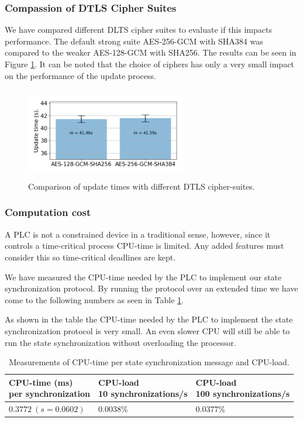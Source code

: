 \subsubsection{Compassion of DTLS Cipher Suites}
We have compared different DLTS cipher suites to evaluate if this impacts performance. The default strong suite AES-256-GCM with SHA384 was compared to the weaker AES-128-GCM with SHA256. The results can be seen in Figure \ref{figure:ciphers}. It can be noted that the choice of ciphers has only a very small impact on the performance of the update process.

\begin{figure}[ht]
\vspace*{-0.2in}
   \centering
    \includegraphics[height=4cm, width=7cm]{papers/digital-twin/images/FIG9_TII-19-1326}
    \vspace*{-0.15in}
    \caption{Comparison of update times with different DTLS cipher-suites.}
    \label{figure:ciphers}
\end{figure}

\subsubsection{Computation cost}
A PLC is not a constrained device in a traditional sense, however, since it controls a time-critical process CPU-time is limited. Any added features must consider this so time-critical deadlines are kept.

We have measured the CPU-time needed by the PLC to implement our state synchronization protocol. By running the protocol over an extended time we have come to the following numbers as seen in Table \ref{table:cpu-time}. 

As shown in the table the CPU-time needed by the PLC to implement the state synchronization protocol is very small. An even slower CPU will still be able to run the state synchronization without overloading the processor.

\begin{table}[]
\begin{tabular}{lll}

 \thead{CPU-time (ms)\\per synchronization} & \thead{ CPU-load  \\ 10 synchronizations/s} & \thead{CPU-load \\ 100 synchronizations/s} \\ \hline
           $0.3772 \: (s = 0.0602)$   & $0.0038\%$   &   $0.0377\%$                       \\ 
\end{tabular}
\caption{Measurements of CPU-time per state synchronization message and CPU-load.}
\label{table:cpu-time}
\end{table}



